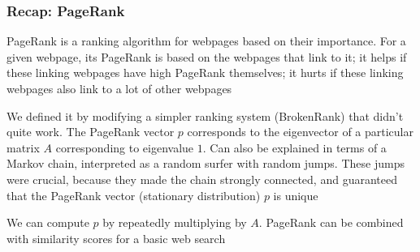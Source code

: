 \documentclass[mathserif]{beamer}
\def\red{\color[rgb]{0.8,0,0}}
\begin{document}

\begin{frame}
\frametitle{Recap: PageRank}
{\red PageRank} is a ranking algorithm for webpages based on their 
importance. For a given webpage, its PageRank is based on 
the webpages that link to it; it helps if these 
linking webpages have high PageRank themselves; it hurts
if these linking webpages also link to a lot of other 
webpages

\bigskip
We defined it by modifying a simpler ranking system
({\red BrokenRank}) that didn't quite work.
The PageRank vector $p$ corresponds to the
{\red eigenvector} of a particular matrix $A$ corresponding to
{\red eigenvalue $1$}. Can also be explained in terms of 
a Markov chain, interpreted as a {\red random surfer} with {\red 
random jumps}. These jumps were crucial, because they made the 
chain strongly connected, and guaranteed that the PageRank 
vector (stationary distribution) $p$ is unique

\bigskip
We can compute $p$ by repeatedly multiplying 
by $A$. PageRank can be combined with similarity scores for 
a basic web search
\end{frame}

%
%
\end{document}
